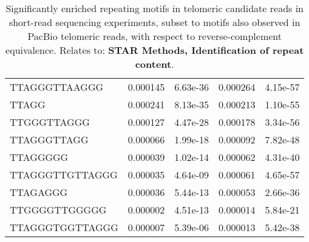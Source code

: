 \begin{samepage}
\begin{table}[h!]
\begin{tabular}{lllll}
TTAGGGTTAAGGG   & 0.000145                  & 6.63e-36                  & 0.000264              & 4.15e-57                      \\
TTAGG           & 0.000241                  & 8.13e-35                  & 0.000213              & 1.10e-55                      \\
TTGGGTTAGGG     & 0.000127                  & 4.47e-28                  & 0.000178              & 3.34e-56                      \\
TTAGGGTTAGG     & 0.000066                  & 1.99e-18                  & 0.000092              & 7.82e-48                      \\
TTAGGGGG        & 0.000039                  & 1.02e-14                  & 0.000062              & 4.31e-40                      \\
TTAGGGTTGTTAGGG & 0.000035                  & 4.64e-09                  & 0.000061              & 4.65e-57                      \\
TTAGAGGG        & 0.000036                  & 5.44e-13                  & 0.000053              & 2.66e-36                      \\
TTGGGGTTGGGGG   & 0.000002                  & 4.51e-13                  & 0.000014              & 5.84e-21                      \\
TTAGGGTGGTTAGGG & 0.000007                  & 5.39e-06                  & 0.000013              & 5.42e-38                      \\
\hline
\end{tabular}
\caption{Significantly enriched repeating motifs in telomeric candidate reads in short-read sequencing experiments, subset to motifs also observed in PacBio telomeric reads, with respect to reverse-complement equivalence. Relates to: \textbf{STAR Methods, Identification of repeat content}.}
\label{tab:shortread_repeatfinder}
\end{table}
\end{samepage}
